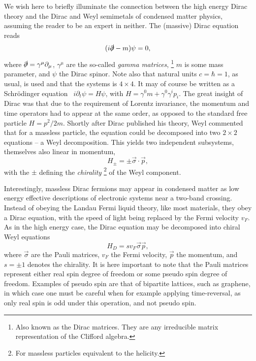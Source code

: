 We wish here to briefly illuminate the connection between the high energy Dirac theory and the Dirac and Weyl semimetals of condensed matter physics, assuming the reader to be an expert in neither.
The (massive) Dirac equation reads
\begin{equation}
  (i \slashed{\partial} - m ) \psi = 0,
\end{equation}
where \( \slashed{\partial} = \gamma^{\mu} \partial_{\mu} \), \( \gamma^{\mu} \) are the so-called \emph{gamma matrices},%
\footnote{Also known as the Dirac matrices. They are any irreducible matrix representation of the Clifford algebra.}
\( m \) is some mass parameter, and \( \psi \) the Dirac spinor.
Note also that natural units \( c = \hbar = 1 \), as usual, is used and that the systems is \( 4\times 4 \).
It may of course be written as a Schrödinger equation~\cite{chernodubThermalTransportGeometry2021} \( i \partial_t \psi = H \psi \), with \( H = \gamma^0 m + \gamma^0\gamma^ip_i \).
The great insight of Dirac was that due to the requirement of Lorentz invariance, the momentum and time operators had to appear at the same order, as opposed to the standard free particle \( H = p^2 /2m \).
Shortly after Dirac published his theory, Weyl commented that for a massless particle, the equation could be decomposed into two \( 2 \times 2 \) equations -- a Weyl decomposition.
This yields two independent subsystems, themselves also linear in momentum,
\begin{equation}
  \label{eq:156}
  H_{\pm} = \pm \vec{\sigma} \cdot \vec{p},
\end{equation}
with the \( \pm \) defining the \emph{chirality}%
\footnote{For massless particles equivalent to the helicity.}
of the Weyl component.

Interestingly, massless Dirac fermions may appear in condensed matter as low energy effective descriptions of electronic systems near a two-band crossing.
Instead of obeying the Landau Fermi liquid theory, like most materials, they obey a Dirac equation, with the speed of light being replaced by the Fermi velocity $v_F$.
As in the high energy case, the Dirac equation may be decomposed into chiral Weyl equations
\begin{equation}
  \label{eq:3}
H_D = s v_{F} \vec{\sigma} \vec{p},
\end{equation}
where $\vec{\sigma}$ are the Pauli matrices, $v_F$ the Fermi velocity, $\vec{p}$ the momentum, and $s=\pm 1$ denotes the chirality.
It is here important to note that the Pauli matrices represent either real spin degree of freedom or some pseudo spin degree of freedom.
Examples of pseudo spin are that of bipartite lattices, such as graphene, in which case one must be careful when for example applying time-reversal, as only real spin is odd under this operation, and not pseudo spin.

